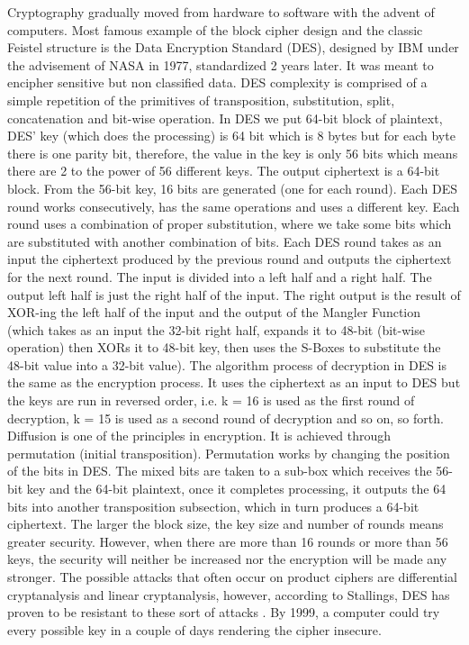 Cryptography gradually moved from hardware to software with the advent of computers. Most famous example of the block cipher design and the classic Feistel structure is the Data Encryption Standard (DES), designed by IBM under the advisement of NASA in 1977, standardized 2 years later. It was meant to encipher sensitive but non classified data. DES complexity is comprised of a simple repetition of the primitives of transposition, substitution, split, concatenation and bit-wise operation.
In DES we put 64-bit block of plaintext,  DES' key (which does the processing) is 64 bit which is 8 bytes but for each byte there is one parity bit, therefore, the value in the key is only 56 bits which means there are 2 to the power of 56 different keys. The output ciphertext is a 64-bit block. 
From the 56-bit key, 16 bits are generated (one for each round). Each DES round works consecutively, has the same operations and uses a different key. Each round uses a combination of proper substitution, where we take some bits which are substituted with another combination of bits. Each DES round takes as an input the ciphertext produced by the previous round and outputs the ciphertext for the next round. The input is divided into a left half and a right half. The output left half is just the right half of the input. The right output is the result of XOR-ing the left half of the input and the output of the Mangler Function (which takes as an input the 32-bit right half, expands it to 48-bit (bit-wise operation) then XORs it to 48-bit key, then uses the S-Boxes to substitute the 48-bit value into a 32-bit value).
The algorithm process of decryption in DES is the same as the encryption process. It uses the ciphertext as an input to DES but the keys are run in reversed order, i.e. k = 16 is used as the first round of decryption, k = 15 is used as a second round of decryption and so on, so forth. 
Diffusion is one of the principles in encryption. It is achieved through permutation (initial transposition). Permutation works by changing the position of the bits in DES. The mixed bits are taken to a sub-box which receives the 56-bit key and the 64-bit plaintext, once it completes processing, it outputs the 64 bits into another transposition subsection, which in turn produces a 64-bit ciphertext. 
The larger the block size, the key size and number of rounds means greater security. However, when there are more than 16 rounds or more than 56 keys, the security will neither be increased nor the encryption will be made any stronger. The possible attacks that often occur on product ciphers are differential cryptanalysis and linear cryptanalysis, however, according to Stallings, DES has proven to be resistant to these sort of attacks \cite{stallings2011-a}. By 1999, a computer could try every possible key in a couple of days rendering the cipher insecure.

